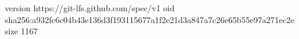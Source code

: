 version https://git-lfs.github.com/spec/v1
oid sha256:a932fc6c04b43e136d3f193115677a1f2e21d3a847a7c26e65b55e97a271ec2e
size 1167
